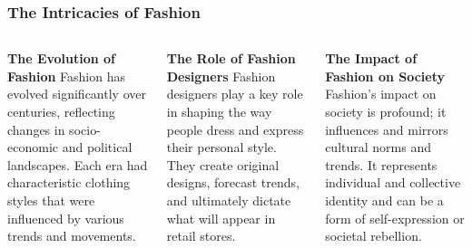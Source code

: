 \documentclass[5pt]{beamer}
\begin{document}
\begin{frame}
\frametitle{The Intricacies of Fashion}
\begin{columns}
\begin{column}{0.3\textwidth}
\begin{block}{\textbf{The Evolution of Fashion}}
Fashion has evolved significantly over centuries, reflecting changes in socio-economic and political landscapes. Each era had characteristic clothing styles that were influenced by various trends and movements.
\end{block}
\end{column}
\begin{column}{0.3\textwidth}
\begin{block}{\textbf{The Role of Fashion Designers}}
Fashion designers play a key role in shaping the way people dress and express their personal style. They create original designs, forecast trends, and ultimately dictate what will appear in retail stores.
\end{block}
\end{column}
\begin{column}{0.3\textwidth}
\begin{block}{\textbf{The Impact of Fashion on Society}}
Fashion's impact on society is profound; it influences and mirrors cultural norms and trends. It represents individual and collective identity and can be a form of self-expression or societal rebellion.
\end{block}
\end{column}
\end{columns}
\end{frame}
\end{document}
